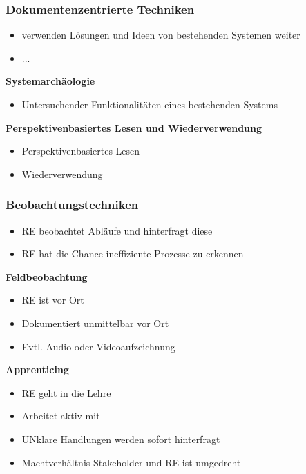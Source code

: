 \documentclass{report}
\theoremstyle{definition}
\theoremstyle{example}
\begin{document}
\subsubsection{Dokumentenzentrierte Techniken}
\begin{itemize}
   \item verwenden Lösungen und Ideen von bestehenden Systemen weiter
   \item ...
\end{itemize}

\textbf{Systemarchäologie}
\begin{itemize}
   \item Untersuchender Funktionalitäten eines bestehenden Systems
\end{itemize}


\textbf{Perspektivenbasiertes Lesen und Wiederverwendung}
\begin{itemize}
   \item Perspektivenbasiertes Lesen
   \item Wiederverwendung
\end{itemize}

\subsubsection{Beobachtungstechniken}
\begin{itemize}
   \item RE beobachtet Abläufe und hinterfragt diese
   \item RE hat die Chance ineffiziente Prozesse zu erkennen
\end{itemize}

\textbf{Feldbeobachtung}
\begin{itemize}
   \item RE ist vor Ort 
   \item Dokumentiert unmittelbar vor Ort
   \item Evtl. Audio oder Videoaufzeichnung
\end{itemize}

\textbf{Apprenticing}
\begin{itemize}
   \item RE geht in die Lehre
   \item Arbeitet aktiv mit
   \item UNklare Handlungen werden sofort hinterfragt
   \item Machtverhältnis Stakeholder und RE ist umgedreht
\end{itemize}
\end{document}
